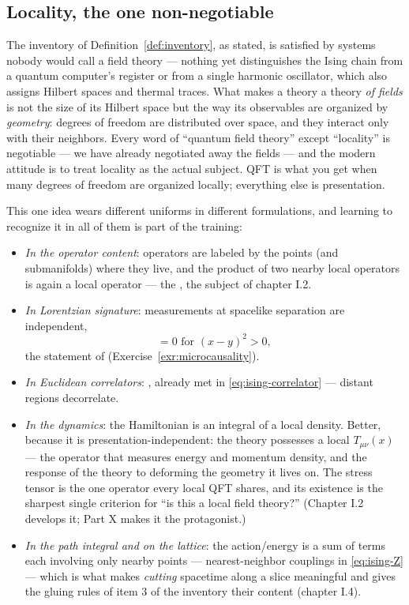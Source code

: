 \subsection{Locality, the one non-negotiable}
\label{sec:locality}

The inventory of Definition~\ref{def:inventory}, as stated, is satisfied by
systems nobody would call a field theory --- nothing yet distinguishes the Ising
chain from a quantum computer's register or from a single harmonic oscillator,
which also assigns Hilbert spaces and thermal traces. What makes a theory a
theory \emph{of fields} is not the size of its Hilbert space but the way its
observables are organized by \emph{geometry}: degrees of freedom are distributed
over space, and they interact only with their neighbors. Every word of ``quantum
field theory'' except ``locality'' is negotiable --- we have already negotiated
away the fields --- and the modern attitude is to treat locality as the actual
subject. QFT is what you get when many degrees of freedom are organized locally;
everything else is presentation.

This one idea wears different uniforms in different formulations, and learning
to recognize it in all of them is part of the training:

\begin{itemize}
\item \emph{In the operator content}: operators are labeled by the points (and
submanifolds) where they live, and the product of two nearby local operators is
again a local operator --- the , the subject of
chapter I.2.
\item \emph{In Lorentzian signature}: measurements at spacelike separation are
independent,
\begin{equation*}
[\op_1(x), \op_2(y)] = 0 \text{ for } (x-y)^2 > 0,
\end{equation*}
the statement of  (Exercise~\ref{exr:microcausality}).
\item \emph{In Euclidean correlators}: , already
met in \eqref{eq:ising-correlator} --- distant regions decorrelate.
\item \emph{In the dynamics}: the Hamiltonian is an integral of a local density.
Better, because it is presentation-independent: the theory possesses a local
 $T_{\mu\nu}(x)$ --- the operator that measures energy and
momentum density, and the response of the theory to deforming the geometry it
lives on. The stress tensor is the one operator every local QFT shares, and its
existence is the sharpest single criterion for ``is this a local field theory?''
(Chapter I.2 develops it; Part X makes it the protagonist.)
\item \emph{In the path integral and on the lattice}: the action/energy is a sum
of terms each involving only nearby points --- nearest-neighbor couplings in
\eqref{eq:ising-Z} --- which is what makes \emph{cutting} spacetime along a slice
meaningful and gives the gluing rules of item 3 of the inventory their content
(chapter I.4).
\end{itemize}

